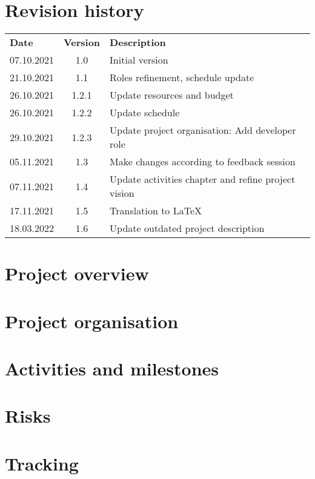 \documentclass[hidelinks]{report}
\begin{document}
	\maketitle

	\chapter*{Revision history}

	\begin{table}[H]
		\centering
		\begin{tabularx}{\textwidth}{ l c X }
			\rowcolor[HTML]{C0C0C0}
			\textbf{Date} & \textbf{Version} & \textbf{Description} \\
			07.10.2021 & 1.0   & Initial version \\
			\rowcolor[HTML]{E7E7E7}
			21.10.2021 & 1.1   & Roles refinement, schedule update \\
			26.10.2021 & 1.2.1 & Update resources and budget \\
			\rowcolor[HTML]{E7E7E7}
			26.10.2021 & 1.2.2 & Update schedule \\
			29.10.2021 & 1.2.3 & Update project organisation: Add developer role \\
			\rowcolor[HTML]{E7E7E7}
			05.11.2021 & 1.3   & Make changes according to feedback session \\
			07.11.2021 & 1.4   & Update activities chapter and refine project vision \\
			\rowcolor[HTML]{E7E7E7}
			17.11.2021 & 1.5   & Translation to LaTeX \\
            18.03.2022 & 1.6   & Update outdated project description \\
		\end{tabularx}
	\end{table}

	\tableofcontents

	\chapter{Project overview}\label{chp:overview}
	\thispagestyle{fancy}
	

	\chapter{Project organisation}\label{chp:organisation}
	\thispagestyle{fancy}
	

	\chapter{Activities and milestones}\label{chp:activities}
	\thispagestyle{fancy}
	

	\chapter{Risks}\label{chp:risks}
	\thispagestyle{fancy}
	

	\chapter{Tracking}\label{chp:tracking}
	\thispagestyle{fancy}
	
\end{document}
